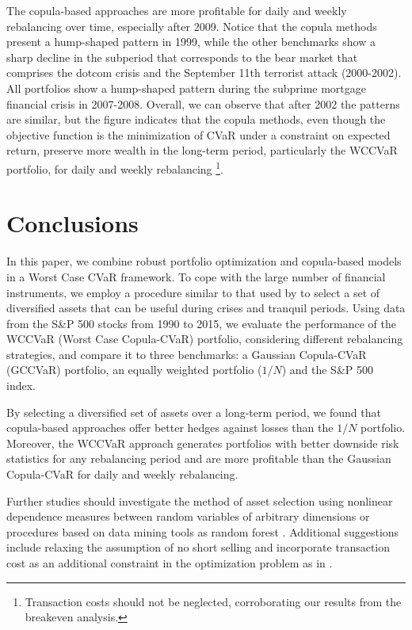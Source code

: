 \documentclass[a4paper,10pt]{article}
\begin{document}
The copula-based approaches are more profitable for daily and weekly rebalancing over time, especially after 2009. Notice that the copula methods present a hump-shaped pattern in 1999, while the other benchmarks show a sharp decline in the subperiod that corresponds to the bear market that comprises the dotcom crisis and the September 11th terrorist attack (2000-2002). All portfolios show a hump-shaped pattern during the subprime mortgage financial crisis in 2007-2008. Overall, we can observe that after 2002 the patterns are similar, but the figure indicates that the copula methods, even though the objective function is the minimization of CVaR under a constraint on expected return, preserve more wealth in the long-term period, particularly the WCCVaR portfolio, for daily and weekly rebalancing \footnote{Transaction costs should not be neglected, corroborating our results from the breakeven analysis.}.

\section{Conclusions}

 In this paper, we combine robust portfolio optimization and copula-based models in a Worst Case CVaR framework. To cope with the large number of financial instruments, we employ a procedure similar to that used by \citet{ggr06} to select a set of diversified assets that can be useful during crises and tranquil periods. Using data from the S\&P 500 stocks from 1990 to 2015, we evaluate the performance of the WCCVaR (Worst Case Copula-CVaR) portfolio, considering different rebalancing strategies, and compare it to three benchmarks: a Gaussian Copula-CVaR (GCCVaR) portfolio, an equally weighted portfolio ($1/N$) and the S\&P 500 index. 

By selecting a diversified set of assets over a long-term period, we found that copula-based approaches offer better hedges against losses than the $1/N$ portfolio. Moreover, the WCCVaR approach generates portfolios with better downside risk statistics for any rebalancing period and are more profitable than the Gaussian Copula-CVaR for daily and weekly rebalancing.

Further studies should investigate the method of asset selection using nonlinear dependence measures between random variables of arbitrary dimensions \citep{lopez2013randomized} or procedures based on data mining tools as random forest \citep{dlrz10}. Additional suggestions include relaxing the assumption of no short selling and incorporate transaction cost as an additional constraint in the optimization problem as in \citet{krokhmal2002}.



\newpage
\end{document}
